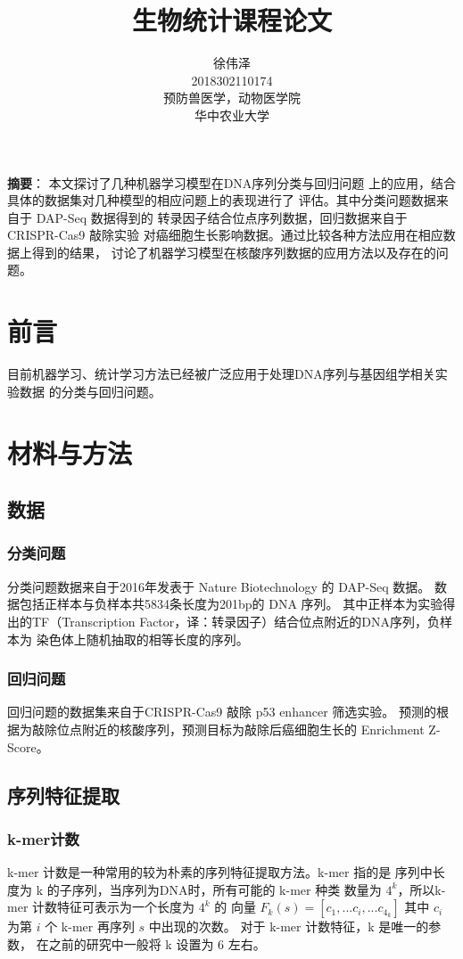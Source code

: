 \documentclass[UTF8]{ctexart}
\title{生物统计课程论文}
\author{徐伟泽\\2018302110174\\预防兽医学，动物医学院\\华中农业大学}
\begin{document}
  \maketitle

  \textbf{摘要}：
  本文探讨了几种机器学习模型在DNA序列分类与回归问题
  上的应用，结合具体的数据集对几种模型的相应问题上的表现进行了
  评估。其中分类问题数据来自于 DAP-Seq 数据得到的
  转录因子结合位点序列数据，回归数据来自于 CRISPR-Cas9 敲除实验
  对癌细胞生长影响数据。通过比较各种方法应用在相应数据上得到的结果，
  讨论了机器学习模型在核酸序列数据的应用方法以及存在的问题。

  \section{前言}
  目前机器学习、统计学习方法已经被广泛应用于处理DNA序列与基因组学相关实验数据
  的分类与回归问题。

  \section{材料与方法}
  \subsection{数据}
  \subsubsection{分类问题}
  分类问题数据来自于2016年发表于 Nature Biotechnology 的 DAP-Seq 数据\autocite{o2016cistrome}。
  数据包括正样本与负样本共5834条长度为201bp的 DNA 序列。
  其中正样本为实验得出的TF（Transcription Factor，译：转录因子）结合位点附近的DNA序列，负样本为
  染色体上随机抽取的相等长度的序列。

  \subsubsection{回归问题}
  回归问题的数据集来自于CRISPR-Cas9 敲除 p53 enhancer 筛选实验\autocite{korkmaz2016functional}。
  预测的根据为敲除位点附近的核酸序列，预测目标为敲除后癌细胞生长的 Enrichment Z-Score。

  \subsection{序列特征提取}
  \subsubsection{k-mer计数}
  k-mer 计数是一种常用的较为朴素的序列特征提取方法。k-mer 指的是
  序列中长度为 k 的子序列，当序列为DNA时，所有可能的 k-mer 种类
  数量为 $4^k$，所以k-mer 计数特征可表示为一个长度为 $4^k$ 的
  向量 $F_k(s) = [c_1, ... c_i, ... c_{4_k}] $ 其中 $c_i$ 为第 $i$
  个 k-mer 再序列 $s$ 中出现的次数。 对于 k-mer 计数特征，k 是唯一的参数，
  在之前的研究中一般将 k 设置为 6 左右\autocite{ghandi2014enhanced,zeng2018prediction}。
\end{document}

